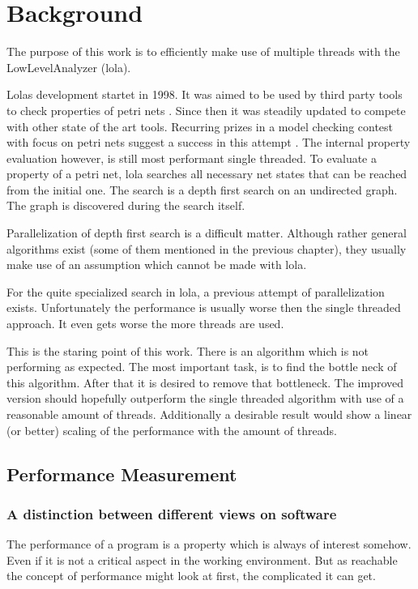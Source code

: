 \chapter{Background}

The purpose of this work is to efficiently make use of multiple threads with the LowLevelAnalyzer (lola).

Lolas development startet in 1998. It was aimed to be used by third party tools to check properties of petri nets \cite{schmidt2000lola}. Since then it was steadily updated to compete with other state of the art tools. Recurring prizes in a model checking contest with focus on petri nets suggest a success in this attempt \cite{MCC2017}.
The internal property evaluation however, is still most performant single threaded. To evaluate a property of a petri net, lola searches all necessary net states that can be reached from the initial one. The search is a depth first search on an undirected graph. The graph is discovered during the search itself.

Parallelization of depth first search is a difficult matter. Although rather general algorithms exist (some of them mentioned in the previous chapter), they usually make use of an assumption which cannot be made with lola.%

For the quite specialized search in lola, a previous attempt of parallelization exists. Unfortunately the performance is usually worse then the single threaded approach. It even gets worse the more threads are used.

This is the staring point of this work. There is an algorithm which is not performing as expected. The most important task, is to find the bottle neck of this algorithm. After that it is desired to remove that bottleneck. The improved version should hopefully outperform the single threaded algorithm with use of a reasonable amount of threads. Additionally a desirable result would show a linear (or better) scaling of the performance with the amount of threads.

\section{Performance Measurement}
\label{benchmarking}
\subsection{A distinction between different views on software}
The performance of a program is a property which is always of interest somehow. Even if it is not a critical aspect in the working environment. But as reachable the concept of performance might look at first, the complicated it can get.

